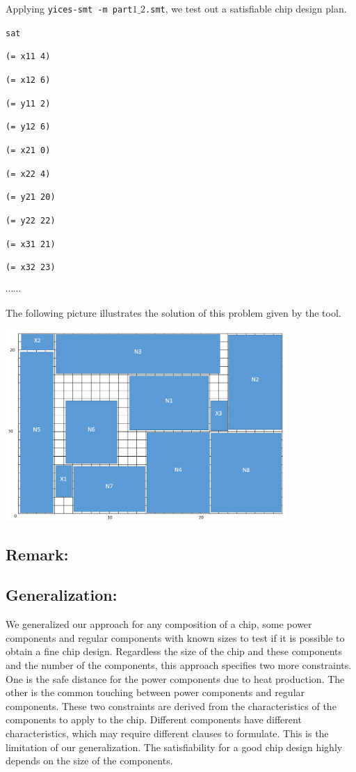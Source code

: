 Applying {\tt yices-smt -m part$1\_2$.smt}, we test out a satisfiable chip design plan.

{\footnotesize

{\tt sat}

{\tt(= x11 4)}

{\tt(= x12 6)}

{\tt(= y11 2)}

{\tt(= y12 6)}

{\tt(= x21 0)}

{\tt(= x22 4)}

{\tt(= y21 20)}

{\tt(= y22 22)}

{\tt(= x31 21)}

{\tt(= x32 23)}

$\cdots \cdots$

}

The following picture illustrates the solution of this problem given by the tool.

\begin{center}
\includegraphics[width=0.8\textwidth]{Part1_2_3.png}
\end{center}

\subsection*{Remark:}


\subsection*{Generalization:} 
We generalized our approach for any composition of a chip, some power components and regular components with known sizes to test if it is possible to obtain a fine chip design. Regardless the size of the chip and these components and the number of the components, this approach specifies two more constraints. One is the safe distance for the power components due to heat production. The other is the common touching between power components and regular components. These two constraints are derived from the characteristics of the components to apply to the chip. Different components have different characteristics, which may require different clauses to formulate. This is the limitation of our generalization. The satisfiability for a good chip design highly depends on the size of the components.




